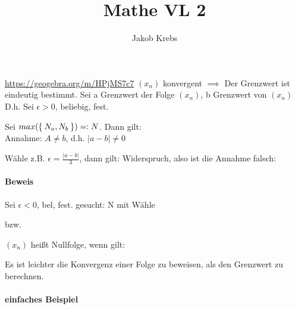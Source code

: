 \documentclass{../tudscript}
\author{Jakob Krebs}
\title{Mathe VL 2}
\begin{document}
    \url{https://geogebra.org/m/HPjMS7c7} 
    $(x_n)$ konvergent $\implies$ Der Grenzwert ist eindeutig bestimmt.
    Sei a Grenzwert der Folge $(x_n)$, b Grenzwert von $(x_n)$
    D.h. Sei $\epsilon > 0$, beliebig, fest.

    Sei $max (\Set{N_a, N_b}) =: N$. Dann gilt: 
    \\

    Annahme: $A \neq b$, d.h. $|a-b| \neq 0$
    

    Wähle z.B. $\epsilon = \frac{|a - b|}{3}$, dann gilt:
    Widerspruch, also ist die Annahme falsch:

    \paragraph{Beweis}
    Sei $\epsilon < 0$, bel, fest.
    gesucht: N mit 
    Wähle
    
    
    bzw.

    $(x_n)$ heißt Nullfolge, wenn gilt:
    
    Es ist leichter die Konvergenz einer Folge zu beweisen, als den Grenzwert 
    zu berechnen.
    \paragraph{einfaches Beispiel}
    
\end{document}
